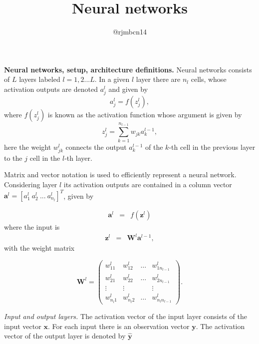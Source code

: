 \documentclass[11pt,onecolumn]{article}
\title{Neural networks}
\author{@rjmbcn14}
\begin{document}
\maketitle 

\textbf{Neural networks, setup, architecture definitions.} Neural networks consists of $L$ layers labeled 
$l = 1,2 ...L$. In a given $l$ layer there are $n_l$ cells, whose activation outputs are denoted 
$a_j^{l}$ and given by 
\begin{equation}
	a_j^{l} = f(z^l_{j}),
\end{equation}
where $f(z^l_{j})$ is known as the activation function whose argument is given by  
\begin{equation}
	z^l_{j} = \sum_{k=1}^{n_{l-1}} w_{jk}a^{l-1}_k,
\end{equation}
here the weight $w^{l}_{jk}$ connects the output $a^{l-1}_k$ of the $k$-th cell in the previous layer 
to the $j$ cell in the $l$-th layer. 

Matrix and vector notation is used to efficiently represent a neural network. 
Considering layer $l$ its activation outputs are contained in a column vector 
$\mathbf{a}^{l} = [a^l_1 ~ a^l_2~...~a^l_{n_l}]^{T}$, given by 

\begin{eqnarray}
	\mathbf{a}^{l} &=& f\left( \mathbf{z}^{l} \right) 
\end{eqnarray}
where the input is
\begin{eqnarray}
	\mathbf{z}^{l}   &=& \mathbf{W}^{l} \mathbf{a}^{l-1},
\end{eqnarray} 
with the weight matrix 

\begin{equation}
	\mathbf{W}^{l} = \left(\begin{array}{cccc} w_{11}^{l} & w_{12}^{l} & \hdots & w_{1n_{l-1}}^{l} \\ 
	w_{21}^{l} & w_{22}^{l} &\hdots & w_{2{n_{l-1}}}^{l}  \\
	\vdots & \vdots & &\vdots \\
	w_{n_{l}1}^{l} & w_{n_{l}2}^{l} &\hdots & w_{n_{l}{n_{l-1}}}^{l} 
	\end{array}\right).
\end{equation}

\textit{Input and output layers.} The activation vector of the input layer consists of the input vector 
$\mathbf{x}$. For each input there is an observation vector $\mathbf{y}$. The activation vector of the 
output layer is denoted by $\mathbf{\hat{y}}$
\end{document}
